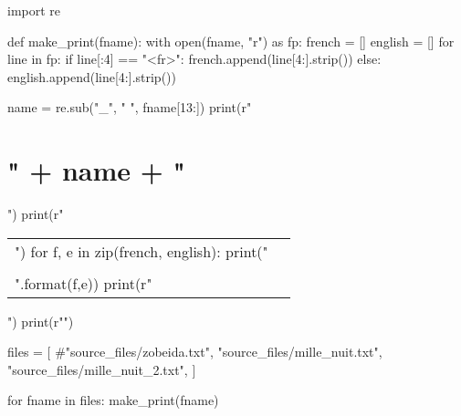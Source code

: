 \documentclass[a5paper]{article}
\begin{document}
\tableofcontents
\clearpage

\begin{pycode}
import re

def make_print(fname):
    with open(fname, "r") as fp:
        french = []
        english = []
        for line in fp:
            if line[:4] == "<fr>":
                french.append(line[4:].strip())
            else:
                english.append(line[4:].strip())

    name = re.sub("_", " ", fname[13:])
    print(r"\section{" + name + "}")
    print(r"\begin{longtable}{PP}")
    for f, e in zip(french, english):
        print("{} & {} \\\\".format(f,e))
    print(r"\end{longtable}")
    print(r"\clearpage")

files = [
#"source_files/zobeida.txt",
"source_files/mille_nuit.txt",
"source_files/mille_nuit_2.txt",
]


for fname in files:
    make_print(fname)
\end{pycode}
\end{document}
